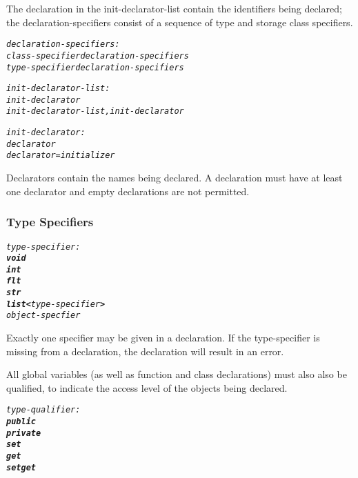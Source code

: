 \documentclass[12pt]{report}
\begin{document}
The declaration in the init-declarator-list contain the identifiers being declared; the declaration-specifiers consist of a sequence of type and storage class specifiers.

\begin{alltt}\begin{singlespace}
         \textit{declaration-specifiers:}
              \textit{class-specifier declaration-specifiers}
              \textit{type-specifier declaration-specifiers}
              
         \textit{init-declarator-list:}
              \textit{init-declarator}
              \textit{init-declarator-list , init-declarator}
              
         \textit{init-declarator:}
              \textit{declarator}
              \textit{declarator = initializer}\end{singlespace}
\end{alltt}

Declarators contain the names being declared. A declaration must have at least one declarator and empty declarations are not permitted.

\subsubsection{Type Specifiers}

\begin{alltt}\begin{singlespace}
         \textit{type-specifier:}
              \textit{\textbf{void}}
              \textit{\textbf{int}}
              \textit{\textbf{flt}}
              \textit{\textbf{str}}
              \textit{\textbf{list<}type-specifier\textbf{>}}
              \textit{object-specfier}\end{singlespace}
\end{alltt}

Exactly one specifier may be given in a declaration. If the type-specifier is missing from a declaration, the declaration will result in an error.

All global variables (as well as function and class declarations) must also also be qualified, to indicate the access level of the objects being declared.

\begin{alltt}\begin{singlespace}
         \textit{type-qualifier:}
              \textit{\textbf{public}}
              \textit{\textbf{private}}
              \textit{\textbf{set}}
              \textit{\textbf{get}}
              \textit{\textbf{setget}}\end{singlespace}
\end{alltt}
\end{document}
